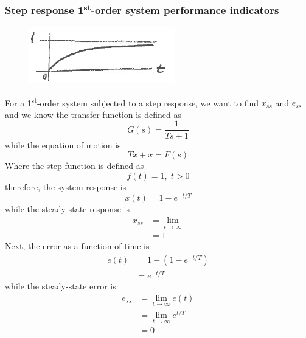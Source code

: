 \documentclass[12pt,letter]{article}
\numberwithin{ex}{section} %
\numberwithin{re}{section} %
\numberwithin{equation}{section}	%
\begin{document}
\subsubsection{Step response 1\textsuperscript{st}-order system performance indicators}

\begin{figure}[H]
	\centering
	\includegraphics[width=2.5in]{../figures/step_response_with_steady_state_error}
\end{figure}



For a 1\textsuperscript{st}-order system subjected to a step response, we want to find $x_{ss}$ and $e_{ss}$ and we know the transfer function is defined as  
\begin{equation}
G(s) = \frac{1}{T s + 1}
\end{equation}
while the equation of motion is
\begin{equation}
T \dot{x} + x = F(s)
\end{equation}
Where the step function is defined as
\begin{equation}
f(t) =1, \; t > 0
\end{equation}
therefore, the system response is
\begin{equation}
x(t) =1-e^{-t/T} 
\end{equation}
while the steady-state response is
\begin{align}
x_{ss} &= \lim\limits_{t \rightarrow \infty} \\
&= 1 \nonumber
\end{align}
Next, the error as a function of time is 
\begin{align}
e(t) &= 1-(1-e^{-t/T}) \\
&= e^{-t/T} \nonumber
\end{align}
while the steady-state error is
\begin{align}
e_{ss} &= \lim\limits_{t \rightarrow \infty}e(t) \\
&= \lim\limits_{t \rightarrow \infty}e^{t/T}  \nonumber \\
&= 0 \nonumber
\end{align}
\end{document}
